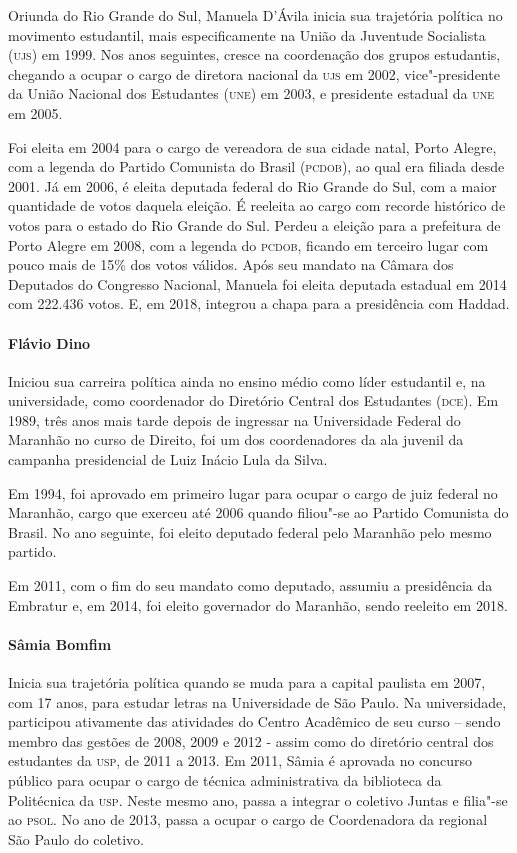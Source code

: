 Oriunda do Rio Grande do Sul, Manuela D'Ávila inicia sua trajetória
política no movimento estudantil, mais especificamente na União da
Juventude Socialista (\textsc{ujs}) em 1999. Nos anos seguintes, cresce na
coordenação dos grupos estudantis, chegando a ocupar o cargo de diretora
nacional da \textsc{ujs} em 2002, vice"-presidente da União Nacional dos
Estudantes (\textsc{une}) em 2003, e presidente estadual da \textsc{une} em 2005.

Foi eleita em 2004 para o cargo de vereadora de sua cidade natal, Porto
Alegre, com a legenda do Partido Comunista do Brasil (\textsc{pcdob}), ao qual
era filiada desde 2001. Já em 2006, é eleita deputada federal do Rio
Grande do Sul, com a maior quantidade de votos daquela eleição. É
reeleita ao cargo com recorde histórico de votos para o estado do Rio
Grande do Sul. Perdeu a eleição para a prefeitura de Porto Alegre em
2008, com a legenda do \textsc{pcdob}, ficando em terceiro lugar com pouco mais
de 15\% dos votos válidos. Após seu mandato na Câmara dos Deputados do
Congresso Nacional, Manuela foi eleita deputada estadual em 2014 com
222.436 votos. E, em 2018, integrou a chapa para a presidência com
Haddad.

\paragraph{Flávio Dino}

Iniciou sua carreira política ainda no ensino médio como líder
estudantil e, na universidade, como coordenador do Diretório Central dos
Estudantes (\textsc{dce}). Em 1989, três anos mais tarde depois de ingressar na
Universidade Federal do Maranhão no curso de Direito, foi um dos
coordenadores da ala juvenil da campanha presidencial de Luiz Inácio
Lula da Silva.

Em 1994, foi aprovado em primeiro lugar para ocupar o cargo de juiz
federal no Maranhão, cargo que exerceu até 2006 quando filiou"-se ao
Partido Comunista do Brasil. No ano seguinte, foi eleito deputado
federal pelo Maranhão pelo mesmo partido.

Em 2011, com o fim do seu mandato como deputado, assumiu a presidência
da Embratur e, em 2014, foi eleito governador do Maranhão, sendo
reeleito em 2018.

\paragraph{Sâmia Bomfim}

Inicia sua trajetória política quando se muda para a capital paulista em
2007, com 17 anos, para estudar letras na Universidade de São Paulo. Na
universidade, participou ativamente das atividades do Centro Acadêmico
de seu curso -- sendo membro das gestões de 2008, 2009 e 2012 - assim
como do diretório central dos estudantes da \textsc{usp}, de 2011 a 2013. Em
2011, Sâmia é aprovada no concurso público para ocupar o cargo de
técnica administrativa da biblioteca da Politécnica da \textsc{usp}. Neste mesmo
ano, passa a integrar o coletivo Juntas e filia"-se ao \textsc{psol}. No ano de
2013, passa a ocupar o cargo de Coordenadora da regional São Paulo do
coletivo.

